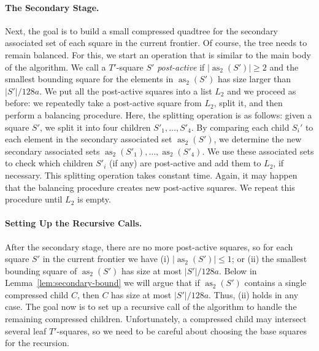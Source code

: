 \documentclass[11pt]{paper}
\DeclareMathOperator {\as}{as}
\begin{document}
      \paragraph{The Secondary Stage.}
      Next, the goal is to build a small compressed quadtree for the secondary
      associated set of each square in the current frontier. Of course,
      the tree needs to remain balanced.
      For this, we start an operation that is similar to the main body of the 
      algorithm.  We call a $T'$-square $S'$ \emph{post-active} if 
      $|\as_2(S')| \geq 2$ and the smallest bounding
      square for the elements in $\as_2(S')$ has size larger than $|S'|/128a$.
      We put all the post-active squares into a list $L_2$ and we proceed
      as before: we repeatedly take a post-active square from $L_2$,
      split it, and then perform a balancing procedure. Here,
      the splitting operation is as follows: given
      a square $S'$, we split it into four children $S'_1, \ldots, S'_4$.
      By comparing each child $S_i'$ to each element in the secondary associated
      set $\as_2(S')$, we determine the new secondary associated sets 
      $\as_2(S'_1), \ldots, \as_2(S'_4)$. We use these associated sets to check
      which children $S'_i$ (if any) are post-active and add them to $L_2$,
      if necessary. This splitting
      operation takes constant time. Again, it may
      happen that the balancing procedure creates new post-active
      squares. We repeat this procedure until 
      $L_2$ is empty.



      \paragraph{Setting Up the Recursive Calls.}
      After the secondary stage, there are no more post-active squares, so 
      for each square $S'$ in the current frontier
      we have (i) $|\as_2(S')| \leq  1$; or (ii) the smallest bounding
      square of $\as_2(S')$ has size at most $|S'|/128a$.
      Below in Lemma~\ref{lem:secondary-bound} 
      we will argue that if $\as_2(S')$ contains a single
      compressed child $C$, then $C$ has size at most
      $|S'|/128a$. Thus, (ii) holds in any case. 
      The goal now is to set up a recursive call of the algorithm to handle
      the remaining compressed children. Unfortunately, a compressed
      child may intersect several leaf $T'$-squares,
      so we need to be careful about choosing the base squares for the
      recursion. 
\end{document}
